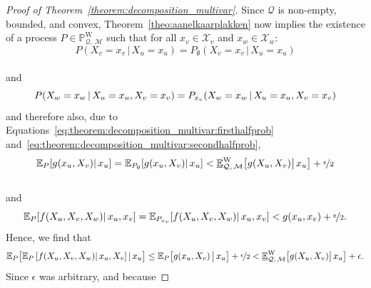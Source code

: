 \documentclass[10pt,a4paper]{paper}
\theoremstyle{definition}
\newcommand{\states}{\mathcal{X}}
\newcommand{\processes}{\mathbb{P}}
\newcommand{\wprocesses}{\processes^{\mathrm{W}}}
\newcommand{\rateset}{\mathcal{Q}}
\begin{document}
\begin{proof}[Proof of Theorem~\ref{theorem:decomposition_multivar}]
Since $\rateset$ is non-empty, bounded, and convex, Theorem~\ref{theo:aanelkaarplakken} now implies the existence of a process $P\in\wprocesses_{\rateset,\,\mathcal{M}}$ such that for all $x_v\in\states_v$ and $x_w\in\states_w$:
\begin{equation*}
P(X_v=x_v\,\vert\,X_u=x_u) = P_\emptyset(X_v=x_v\,\vert\,X_u=x_u)
\end{equation*}\\[-20pt]
and
\begin{equation*}
P(X_w=x_w\,\vert\,X_u=x_u,X_v=x_v) = P_{x_v}(X_w=x_w\,\vert\,X_u=x_u,X_v=x_v)\vspace{6pt}
\end{equation*}
and therefore also, due to Equations~\eqref{eq:theorem:decomposition_multivar:firsthalfprob} and~\eqref{eq:theorem:decomposition_multivar:secondhalfprob},
\begin{equation*}%
\mathbb{E}_P[g(x_u,X_v)\vert\,x_u]
=\mathbb{E}_{P_\emptyset}[g(x_u,X_v)\vert\,x_u]
< \underline{\mathbb{E}}^{\mathrm{W}}_{\rateset,\,\mathcal{M}}\bigl[g(X_u,X_v)\big\vert\,x_u\bigr]
+\nicefrac{\epsilon}{2}
\end{equation*}\\[-20pt]
and
\begin{equation*}%
\mathbb{E}_P[f(X_u,X_v,X_w)\vert\,x_u,x_v]
=\mathbb{E}_{P_{x_v}}[f(X_u,X_v,X_w)\vert\, x_u,x_v]
<g(x_u,x_v)+\nicefrac{\epsilon}{2}.\vspace{6pt}
\end{equation*}
Hence, we find that
\begin{align*}
\mathbb{E}_P\bigl[\mathbb{E}_P\left[f(X_u,X_v,X_w)\vert\,x_u,X_v\right]\vert\,x_u\bigr]
\leq
\mathbb{E}_P\bigl[g(x_u,X_v)\,\big\vert\,x_u\bigr]+\nicefrac{\epsilon}{2}
< \underline{\mathbb{E}}^{\mathrm{W}}_{\rateset,\,\mathcal{M}}\bigl[g(X_u,X_v)\big\vert\,x_u\bigr]
+\epsilon.
\end{align*}
Since $\epsilon$ was arbitrary, and because

\end{proof}
\end{document}
